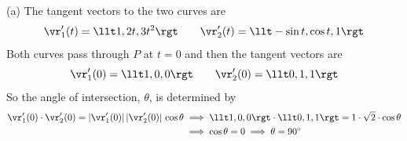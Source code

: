 \begin{solution}
(a) The tangent vectors to the two curves are
\begin{equation*}
\vr'_1(t)=\llt 1, 2t, 3t^2\rgt\qquad 
\vr'_2(t)=\llt-\sin t, \cos t, 1\rgt
\end{equation*}
Both curves pass through $P$ at $t=0$ and then the tangent vectors are
\begin{equation*}
\vr'_1(0)=\llt 1, 0, 0\rgt\qquad 
\vr'_2(0)=\llt 0, 1, 1\rgt
\end{equation*}
So the angle of intersection, $\theta$, is determined by
\begin{align*}
\vr'_1(0)\cdot\vr'_2(0)=|\vr'_1(0)|\,|\vr'_2(0)|\,\cos\theta
&\implies \llt 1, 0, 0\rgt\cdot\llt 0, 1, 1\rgt=1\cdot\sqrt{2}\cdot\cos\theta
\\
&\implies\cos\theta=0\implies \theta=90^\circ
\end{align*}


\end{solution}
